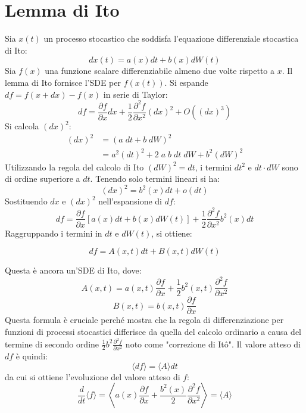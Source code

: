 \section{Lemma di Ito}
Sia $x(t)$ un processo stocastico che soddisfa l'equazione differenziale stocastica di Ito:
\begin{equation}
dx(t) = a(x)dt + b(x)dW(t)
\end{equation}
Sia $f(x)$ una funzione scalare differenziabile almeno due volte rispetto a $x$.
Il lemma di Ito fornisce l'SDE per $f(x(t))$.
Si espande $df = f(x+dx) - f(x)$ in serie di Taylor:
\begin{equation}
df = \frac{\partial f}{\partial x}dx + \frac{1}{2}\frac{\partial^{2}f}{\partial x^{2}}(dx)^{2} + O((dx)^3)
\end{equation}
Si calcola $(dx)^2$:
\begin{equation} 
\begin{aligned}
(dx)^2 &= (a \;dt + b \;dW)^2 \\ &= a^2(dt)^2 + 2 \;a \; b \; dt \; dW + b^2(dW)^2 \end{aligned}
\end{equation}
Utilizzando la regola del calcolo di Ito $(dW)^2=dt$, i termini $dt^2$ e $dt \cdot dW$ sono di ordine superiore a $dt$. Tenendo solo termini lineari si ha:
\begin{equation}
(dx)^2 = b^2(x)dt + o(dt)
\end{equation}
Sostituendo $dx$ e $(dx)^2$ nell'espansione di $df$:
\begin{equation}
df = \frac{\partial f}{\partial x}[a(x)dt + b(x)dW(t)] + \frac{1}{2}\frac{\partial^{2}f}{\partial x^{2}}b^2(x)dt
\end{equation}
Raggruppando i termini in $dt$ e $dW(t)$, si ottiene:
\begin{tcolorbox}[colback=colorA!5,colframe=colorA, title=Lemma di Ito]
\begin{equation}
df = A(x,t)dt + B(x,t)dW(t)
\end{equation}
\end{tcolorbox}
Questa è ancora un'SDE di Ito, dove:
\begin{equation}
A(x,t) = a(x,t)\frac{\partial f}{\partial x} + \frac{1}{2}b^2(x,t)\frac{\partial^{2}f}{\partial x^{2}}
\end{equation}
\begin{equation}
B(x,t) = b(x,t)\frac{\partial f}{\partial x}
\end{equation}
Questa formula è cruciale perché mostra che la regola di differenziazione per funzioni di processi stocastici differisce da quella del calcolo ordinario a causa del termine di secondo ordine $\frac{1}{2}b^2 \frac{\partial^2 f}{\partial x^2}$ noto come "correzione di Itô".
Il valore atteso di $df$ è quindi:
\begin{equation}
\langle df \rangle = \langle A \rangle dt
\end{equation}
da cui si ottiene l'evoluzione del valore atteso di $f$:
\begin{equation}
\frac{d}{dt}\langle f \rangle = \left\langle a(x)\frac{\partial f}{\partial x} + \frac{b^2(x)}{2}\frac{\partial^2 f}{\partial x^2} \right\rangle = \langle A \rangle
\end{equation}


